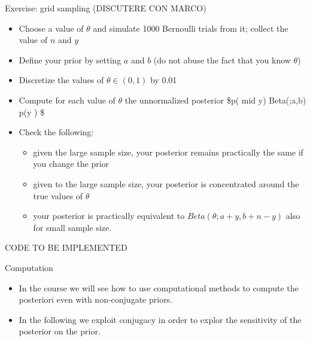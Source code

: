 \documentclass[
  13pt,
  ignorenonframetext,
]{beamer}
\providecommand{\tightlist}{%
  \setlength{\itemsep}{0pt}\setlength{\parskip}{0pt}}
\begin{document}
\begin{frame}{Exercise: grid sampling (DISCUTERE CON MARCO)}
\protect\hypertarget{exercise-grid-sampling-discutere-con-marco}{}
\begin{itemize}
\tightlist
\item
  Choose a value of \(\theta\) and simulate 1000 Bernoulli trials from
  it; collect the value of \(n\) and \(y\)
\item
  Define your prior by setting \(a\) and \(b\) (do not abuse the fact
  that you know \(\theta\))
\item
  Discretize the values of \(\theta \in (0,1)\) by 0.01
\item
  Compute for each value of \(\theta\) the unnormalized posterior
  \$p(\theta \textbar{} mid y) \propto Beta(\theta;a,b) p(y \mid \theta)
  \$
\item
  Check the following:

  \begin{itemize}
  \tightlist
  \item
    given the large sample size, your posterior remains practically the
    same if you change the prior
  \item
    given to the large sample size, your posterior is concentrated
    around the true values of \(\theta\)
  \item
    your posterior is practically equivalent to
    \(Beta(\theta;a+y,b+n-y)\) also for small sample size.
  \end{itemize}
\end{itemize}
\end{frame}

\begin{frame}{CODE TO BE IMPLEMENTED}
\protect\hypertarget{code-to-be-implemented}{}
\end{frame}

\begin{frame}{Computation}
\protect\hypertarget{computation}{}
\begin{itemize}
\item
  In the course we will see how to use computational methods to compute
  the posteriori even with non-conjugate priors.
\item
  In the following we exploit conjugacy in order to explor the
  sensitivity of the posterior on the prior.
\end{itemize}
\end{frame}
\end{document}
